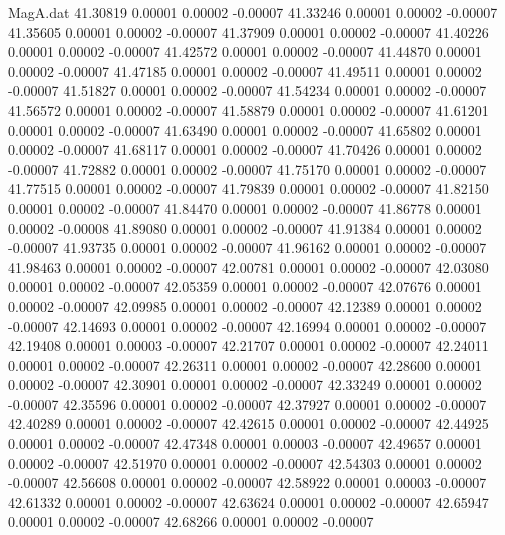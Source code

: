 \begin{filecontents}{MagA.dat}
  41.30819    0.00001    0.00002   -0.00007
  41.33246    0.00001    0.00002   -0.00007
  41.35605    0.00001    0.00002   -0.00007
  41.37909    0.00001    0.00002   -0.00007
  41.40226    0.00001    0.00002   -0.00007
  41.42572    0.00001    0.00002   -0.00007
  41.44870    0.00001    0.00002   -0.00007
  41.47185    0.00001    0.00002   -0.00007
  41.49511    0.00001    0.00002   -0.00007
  41.51827    0.00001    0.00002   -0.00007
  41.54234    0.00001    0.00002   -0.00007
  41.56572    0.00001    0.00002   -0.00007
  41.58879    0.00001    0.00002   -0.00007
  41.61201    0.00001    0.00002   -0.00007
  41.63490    0.00001    0.00002   -0.00007
  41.65802    0.00001    0.00002   -0.00007
  41.68117    0.00001    0.00002   -0.00007
  41.70426    0.00001    0.00002   -0.00007
  41.72882    0.00001    0.00002   -0.00007
  41.75170    0.00001    0.00002   -0.00007
  41.77515    0.00001    0.00002   -0.00007
  41.79839    0.00001    0.00002   -0.00007
  41.82150    0.00001    0.00002   -0.00007
  41.84470    0.00001    0.00002   -0.00007
  41.86778    0.00001    0.00002   -0.00008
  41.89080    0.00001    0.00002   -0.00007
  41.91384    0.00001    0.00002   -0.00007
  41.93735    0.00001    0.00002   -0.00007
  41.96162    0.00001    0.00002   -0.00007
  41.98463    0.00001    0.00002   -0.00007
  42.00781    0.00001    0.00002   -0.00007
  42.03080    0.00001    0.00002   -0.00007
  42.05359    0.00001    0.00002   -0.00007
  42.07676    0.00001    0.00002   -0.00007
  42.09985    0.00001    0.00002   -0.00007
  42.12389    0.00001    0.00002   -0.00007
  42.14693    0.00001    0.00002   -0.00007
  42.16994    0.00001    0.00002   -0.00007
  42.19408    0.00001    0.00003   -0.00007
  42.21707    0.00001    0.00002   -0.00007
  42.24011    0.00001    0.00002   -0.00007
  42.26311    0.00001    0.00002   -0.00007
  42.28600    0.00001    0.00002   -0.00007
  42.30901    0.00001    0.00002   -0.00007
  42.33249    0.00001    0.00002   -0.00007
  42.35596    0.00001    0.00002   -0.00007
  42.37927    0.00001    0.00002   -0.00007
  42.40289    0.00001    0.00002   -0.00007
  42.42615    0.00001    0.00002   -0.00007
  42.44925    0.00001    0.00002   -0.00007
  42.47348    0.00001    0.00003   -0.00007
  42.49657    0.00001    0.00002   -0.00007
  42.51970    0.00001    0.00002   -0.00007
  42.54303    0.00001    0.00002   -0.00007
  42.56608    0.00001    0.00002   -0.00007
  42.58922    0.00001    0.00003   -0.00007
  42.61332    0.00001    0.00002   -0.00007
  42.63624    0.00001    0.00002   -0.00007
  42.65947    0.00001    0.00002   -0.00007
  42.68266    0.00001    0.00002   -0.00007

\end{filecontents}
